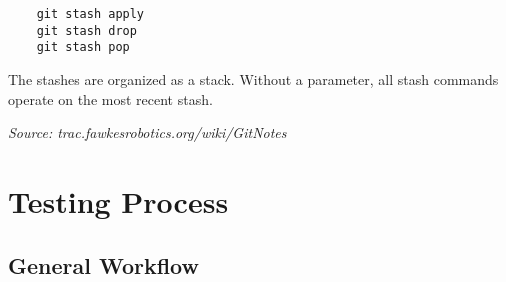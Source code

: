 \documentclass[twoside,12pt,a4paper]{article}
\begin{document}
\begin{lstlisting}
	git stash apply
	git stash drop
	git stash pop
\end{lstlisting}
\vspace*{0.25cm}

The stashes are organized as a stack. Without a parameter, all stash commands operate on the most recent stash.


\begin{flushright} \emph{Source: trac.fawkesrobotics.org/wiki/GitNotes} \end{flushright}




\section{Testing Process} %
\label{sec:testing_process}

\subsection{General Workflow} %
\label{sub:general_workflow}
\end{document}
